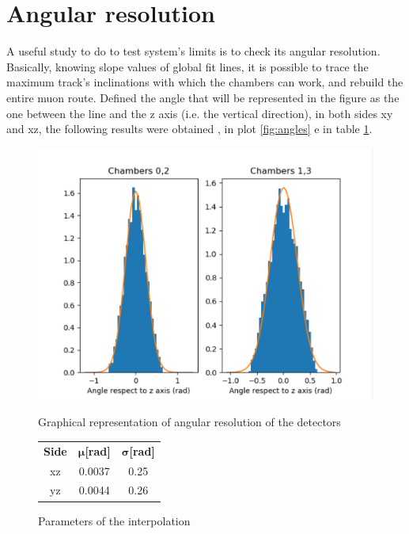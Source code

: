 \documentclass[a4paper,11pt]{book}
\begin{document}
\section{Angular resolution}

A useful study to do to test system's limits is to check its angular resolution. Basically, knowing slope values of global fit lines, it is possible to trace the maximum track's inclinations with which the chambers can work, and rebuild the entire muon route. Defined the angle that will be represented in the figure as the one between the line and the z axis (i.e. the vertical direction), in both sides xy and xz, the following results were obtained , in plot \ref{fig:angles} e in table \ref{tab:angles}. \\
\begin{figure}[hbtp]
\begin{minipage}[c]{0.6\textwidth}
\centering
\includegraphics[scale=0.6]{pictures/Angles.pdf}
\caption{Graphical representation of angular resolution of the detectors}
\label{fig:angles}
\end{minipage} \quad
\begin{minipage}[c]{0.4\textwidth}
\begin{tabular}{c | c  c}
\toprule
 \textbf{Side} & $\bm{\mu}$\textbf{[rad]} & $\bm{\sigma}$\textbf{[rad]}\\
xz & 0.0037 & 0.25\\
yz & 0.0044 & 0.26\\
\bottomrule
\end{tabular}
\caption{Parameters of the interpolation}
\label{tab:angles}
\end{minipage}
\end{figure}
\end{document}
